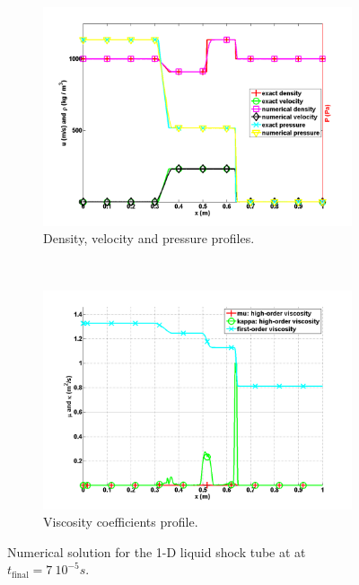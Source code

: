 \documentclass[review,10pt]{elsarticle}
\begin{document}
\begin{figure}[H]
        \centering
        \begin{subfigure}[b]{0.75\textwidth}
                \centering
                \includegraphics[width=\textwidth]{figures/LiquidSrongShock_density_velocity_pressure_profiles.png}
                \caption{Density, velocity and pressure profiles.}
                \label{fig:1d_strong_shock_var}
        \end{subfigure}\\
        \begin{subfigure}[b]{0.75\textwidth}
                \centering
                \includegraphics[width=\textwidth]{figures/LiquidSrongShock_viscosity.png}
                \caption{Viscosity coefficients profile.}
                \label{fig:1d_strong_shock_visc}
        \end{subfigure}
        \caption{Numerical solution for the 1-D liquid shock tube at  at $t_{\text{final}} = 7 \  10^{-5}s$.}
				\label{fig:1d_strong_shock}
\end{figure}
\end{document}
